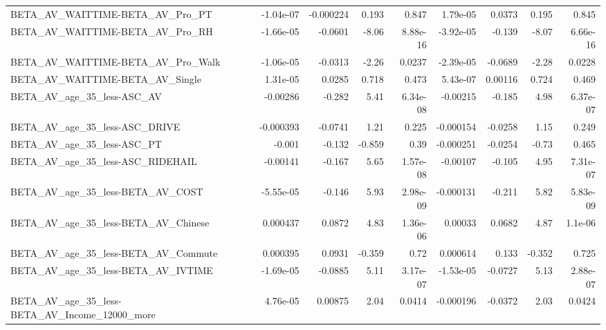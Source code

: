 \begin{tabular}{lrrrrrrrr}
BETA\_AV\_WAITTIME-BETA\_AV\_Pro\_PT                    &   -1.04e-07 &    -0.000224 &    0.193 &    0.847 &   1.79e-05 &      0.0373 &        0.195 &         0.845 \\
BETA\_AV\_WAITTIME-BETA\_AV\_Pro\_RH                    &   -1.66e-05 &      -0.0601 &    -8.06 & 8.88e-16 &  -3.92e-05 &      -0.139 &        -8.07 &      6.66e-16 \\
BETA\_AV\_WAITTIME-BETA\_AV\_Pro\_Walk                  &   -1.06e-05 &      -0.0313 &    -2.26 &   0.0237 &  -2.39e-05 &     -0.0689 &        -2.28 &        0.0228 \\
BETA\_AV\_WAITTIME-BETA\_AV\_Single                    &    1.31e-05 &       0.0285 &    0.718 &    0.473 &   5.43e-07 &     0.00116 &        0.724 &         0.469 \\
BETA\_AV\_age\_35\_less-ASC\_AV                         &    -0.00286 &       -0.282 &     5.41 & 6.34e-08 &   -0.00215 &      -0.185 &         4.98 &      6.37e-07 \\
BETA\_AV\_age\_35\_less-ASC\_DRIVE                      &   -0.000393 &      -0.0741 &     1.21 &    0.225 &  -0.000154 &     -0.0258 &         1.15 &         0.249 \\
BETA\_AV\_age\_35\_less-ASC\_PT                         &      -0.001 &       -0.132 &   -0.859 &     0.39 &  -0.000251 &     -0.0254 &        -0.73 &         0.465 \\
BETA\_AV\_age\_35\_less-ASC\_RIDEHAIL                   &    -0.00141 &       -0.167 &     5.65 & 1.57e-08 &   -0.00107 &      -0.105 &         4.95 &      7.31e-07 \\
BETA\_AV\_age\_35\_less-BETA\_AV\_COST                   &   -5.55e-05 &       -0.146 &     5.93 & 2.98e-09 &  -0.000131 &      -0.211 &         5.82 &      5.83e-09 \\
BETA\_AV\_age\_35\_less-BETA\_AV\_Chinese                &    0.000437 &       0.0872 &     4.83 & 1.36e-06 &    0.00033 &      0.0682 &         4.87 &       1.1e-06 \\
BETA\_AV\_age\_35\_less-BETA\_AV\_Commute                &    0.000395 &       0.0931 &   -0.359 &     0.72 &   0.000614 &       0.133 &       -0.352 &         0.725 \\
BETA\_AV\_age\_35\_less-BETA\_AV\_IVTIME                 &   -1.69e-05 &      -0.0885 &     5.11 & 3.17e-07 &  -1.53e-05 &     -0.0727 &         5.13 &      2.88e-07 \\
BETA\_AV\_age\_35\_less-BETA\_AV\_Income\_12000\_more      &    4.76e-05 &      0.00875 &     2.04 &   0.0414 &  -0.000196 &     -0.0372 &         2.03 &        0.0424 \\

\end{tabular}
